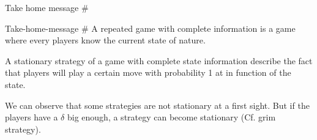 \begin{frame}{Take home message \#}
    \begin{block}{Take-home-message \#}
        A {\color{green}repeated game with complete information} is a game where every players know the current state of nature.
        
        A {\color{green}stationary strategy} of a game with complete state information describe the fact that players will play a certain move with probability 1 at in function of the state.
        
        We can observe that some strategies are not stationary at a first sight. But if the players have a $\delta$ big enough, a strategy can become stationary (Cf. grim strategy).
    \end{block}

\end{frame}